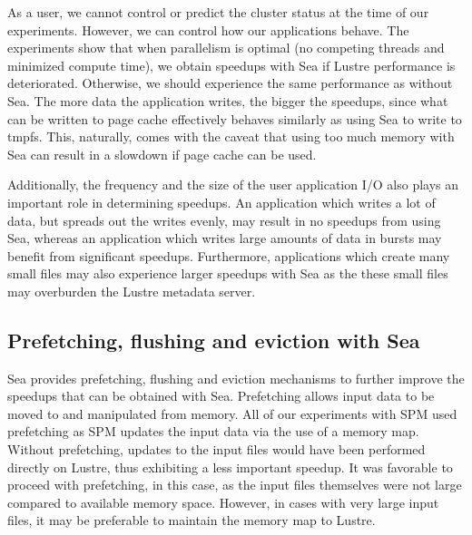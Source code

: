     As a user, we cannot control or predict the cluster status at the time of
    our experiments. However, we can control how our applications behave. The
    experiments show that when parallelism is optimal (no competing threads and
    minimized compute time), we obtain speedups with Sea if Lustre performance
    is deteriorated. Otherwise, we should experience the same performance as 
    without Sea. The more data the application writes, the bigger the speedups, since what
    can be written to page cache effectively behaves similarly as using Sea to write
    to tmpfs. This, naturally, comes with the caveat that using too much memory with
    Sea can result in a slowdown if page cache can be used.
    
    Additionally, the frequency and the size of the user application I/O also
    plays an important role in determining speedups. An application which writes
    a lot of data, but spreads out the writes evenly, may result in no
    speedups from using Sea, whereas an application which writes large amounts
    of data in bursts may benefit from significant speedups. Furthermore,
    applications which create many small files may also experience larger
    speedups with Sea as the these small files may overburden the Lustre
    metadata server.

    
    \subsection{Prefetching, flushing and eviction with Sea}

    Sea provides prefetching, flushing and eviction mechanisms to further improve
    the speedups that can be obtained with Sea. Prefetching allows input data to be moved
    to and manipulated from memory. All of our experiments with SPM used prefetching as
    SPM updates the input data via the use of a memory map. Without prefetching, updates
    to the input files would have been performed directly on Lustre, thus exhibiting a
    less important speedup. It was favorable to proceed with prefetching, in this case,
    as the input files themselves were not large compared to available memory space. However,
    in cases with very large input files, it may be preferable to maintain the memory map
    to Lustre.

